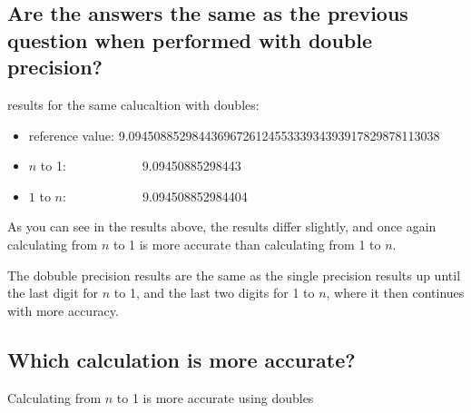 \documentclass[12pt]{article}
\begin{document}
\subsection*{Are the answers the same as the previous question when performed with double precision?}
\item results for the same calucaltion with doubles:
\begin{itemize}
\item reference value:  9.0945088529844369672612455333934393917829878113038
\item $n$ to 1:\ \ \ \ \ \ \ \ \ \ \ \ 9.09450885298443
\item $1$ to $n$:\ \ \ \ \ \ \ \ \ \ \ \ 9.094508852984404
\end{itemize}
\item As you can see in the results above, the results differ slightly, and once again calculating from $n$ to 1 is more accurate than calculating from 1 to $n$.
\item The dobuble precision results are the same as the single precision results up until the last digit for $n$ to 1, and the last two digits for 1 to $n$, where it then continues with more accuracy.
\begin{itemize}
\subsection*{Which calculation is more accurate?}
\end{itemize}
\item Calculating from $n$ to 1 is more accurate using doubles
\end{document}

